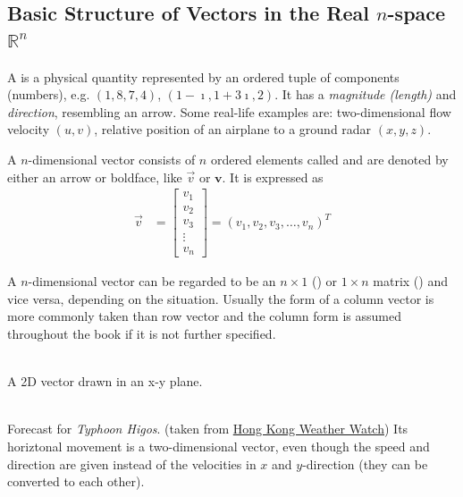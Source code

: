 \subsection{Basic Structure of Vectors in the Real $n$-space $\mathbb{R}^n$}
A  is a physical quantity represented by an ordered tuple of components (numbers), e.g. $(1, 8, 7, 4)$, $(1-\imath, 1+3\imath, 2)$. It has a \textit{magnitude (length)} and \textit{direction}, resembling an arrow. Some real-life examples are: two-dimensional flow velocity $(u, v)$, relative position of an airplane to a ground radar $(x, y, z)$.
\begin{defn}
\label{defn:geometvec}
A $n$-dimensional vector consists of $n$ ordered elements called  and are denoted by either an arrow or boldface, like $\vec{v}$ or $\textbf{v}$. It is expressed as
\begin{align*}
\vec{v} &=
\begin{bmatrix}
v_1 \\
v_2 \\
v_3 \\
\vdots \\
v_n
\end{bmatrix}
=
(v_1, v_2, v_3, \ldots, v_n)^T
\end{align*}
\end{defn}
A $n$-dimensional vector can be regarded to be an $n \times 1$ () or $1 \times n$ matrix () and vice versa, depending on the situation. Usually the form of a column vector is more commonly taken than row vector and the column form is assumed throughout the book if it is not further specified.\par
{}\\    
A 2D vector drawn in an x-y plane.\par
{\\
Forecast for \textit{Typhoon Higos}. (taken from \href{http://www.hkww.org/weather/tcarchive.html}{Hong Kong Weather Watch}) Its horiztonal movement is a two-dimensional vector, even though the speed and direction are given instead of the velocities in $x$ and $y$-direction (they can be converted to each other).\par}

